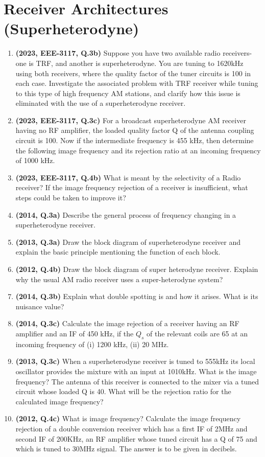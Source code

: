 \documentclass[12pt, a4paper]{article}
\begin{document}
	\section{Receiver Architectures (Superheterodyne)}
	\begin{enumerate}
		\item \textbf{(2023, EEE-3117, Q.3b)} Suppose you have two available radio receivers- one is TRF, and another is superheterodyne. You are tuning to 1620kHz using both receivers, where the quality factor of the tuner circuits is 100 in each case. Investigate the associated problem with TRF receiver while tuning to this type of high frequency AM stations, and clarify how this issue is eliminated with the use of a superheterodyne receiver.
		\item \textbf{(2023, EEE-3117, Q.3c)} For a broadcast superheterodyne AM receiver having no RF amplifier, the loaded quality factor Q of the antenna coupling circuit is 100. Now if the intermediate frequency is 455 kHz, then determine the following image frequency and its rejection ratio at an incoming frequency of 1000 kHz.
		\item \textbf{(2023, EEE-3117, Q.4b)} What is meant by the selectivity of a Radio receiver? If the image frequency rejection of a receiver is insufficient, what steps could be taken to improve it?
		\item \textbf{(2014, Q.3a)} Describe the general process of frequency changing in a superheterodyne receiver.
		\item \textbf{(2013, Q.3a)} Draw the block diagram of superheterodyne receiver and explain the basic principle mentioning the function of each block.
		\item \textbf{(2012, Q.4b)} Draw the block diagram of super heterodyne receiver. Explain why the usual AM radio receiver uses a super-heterodyne system?
		
		\item \textbf{(2014, Q.3b)} Explain what double spotting is and how it arises. What is its nuisance value?
		
		\item \textbf{(2014, Q.3c)} Calculate the image rejection of a receiver having an RF amplifier and an IF of 450 kHz, if the $Q_s$ of the relevant coils are 65 at an incoming frequency of (i) 1200 kHz, (ii) 20 MHz.
		\item \textbf{(2013, Q.3c)} When a superheterodyne receiver is tuned to 555kHz its local oscillator provides the mixture with an input at 1010kHz. What is the image frequency? The antenna of this receiver is connected to the mixer via a tuned circuit whose loaded Q is 40. What will be the rejection ratio for the calculated image frequency?
		\item \textbf{(2012, Q.4c)} What is image frequency? Calculate the image frequency rejection of a double conversion receiver which has a first IF of 2MHz and second IF of 200KHz, an RF amplifier whose tuned circuit has a Q of 75 and which is tuned to 30MHz signal. The answer is to be given in decibels.
		

\end{enumerate}
\end{document}

